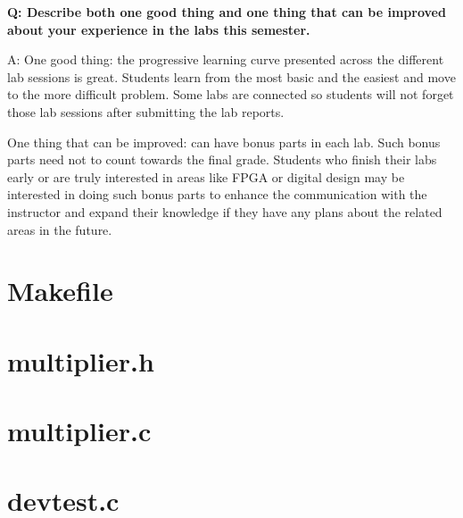 \documentclass[11pt,letterpaper,titlepage]{article}
\begin{document}
\newpage

\textbf{Q: Describe both one good thing and one thing that can be improved about your experience
in the labs this semester.}

A: One good thing: the progressive learning curve presented across the different lab sessions is great. Students learn from the most basic and the easiest and move to the more difficult problem. Some labs are connected so students will not forget those lab sessions after submitting the lab reports.

One thing that can be improved: can have bonus parts in each lab. Such bonus parts need not to count towards the final grade. Students who finish their labs early or are truly interested in areas like FPGA or digital design may be interested in doing such bonus parts to enhance the communication with the instructor and expand their knowledge if they have any plans about the related areas in the future.

\newpage

\begin{appendices}

\section{Makefile}
\label{appendix:makefile}


\section{multiplier.h}
\label{appendix:sourcecode_multiplier_header}


\section{multiplier.c}
\label{appendix:sourcecode_multiplier}


\section{devtest.c}
\label{appendix:sourcecode_devtest}


\end{appendices}
\end{document}
